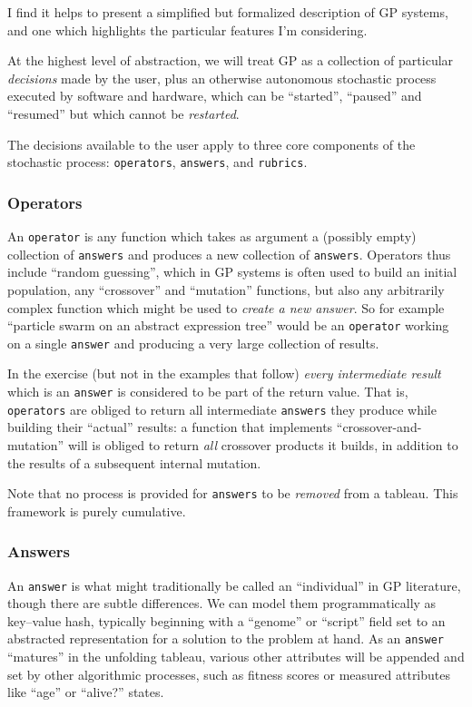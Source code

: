 I find it helps to present a simplified but formalized description of GP systems, and one which highlights the particular features I'm considering.

At the highest level of abstraction, we will treat GP as a collection of particular \emph{decisions} made by the user, plus an otherwise autonomous stochastic process executed by software and hardware, which can be ``started'', ``paused'' and ``resumed'' but which cannot be \emph{restarted}.

The decisions available to the user apply to three core components of the stochastic process: {\tt operators}, {\tt answers}, and {\tt rubrics}.

\subsubsection{Operators}\hypertarget{operators}{}\label{operators}

An {\tt operator} is any function which takes as argument a (possibly empty) collection of {\tt answers} and produces a new collection of {\tt answers}. Operators thus include ``random guessing'', which in GP systems is often used to build an initial population, any ``crossover'' and ``mutation'' functions, but also any arbitrarily complex function which might be used to \emph{create a new answer}. So for example ``particle swarm on an abstract expression tree'' would be an {\tt operator} working on a single {\tt answer} and producing a very large collection of results.

In the exercise (but not in the examples that follow) \emph{every intermediate result} which is an {\tt answer} is considered to be part of the return value. That is, {\tt operators} are obliged to return all intermediate {\tt answers} they produce while building their ``actual'' results: a function that implements ``crossover-and-mutation'' will is obliged to return \emph{all} crossover products it builds, in addition to the results of a subsequent internal mutation.

Note that no process is provided for {\tt answers} to be \emph{removed} from a tableau. This framework is purely cumulative.

\subsubsection{Answers}\hypertarget{answers}{}\label{answers}

An {\tt answer} is what might traditionally be called an ``individual'' in GP literature, though there are subtle differences. We can model them programmatically as key--value hash, typically beginning with a ``genome'' or ``script'' field set to an abstracted representation for a solution to the problem at hand. As an {\tt answer} ``matures'' in the unfolding tableau, various  other attributes will be appended and set by other algorithmic processes, such as fitness scores or measured attributes like ``age'' or ``alive?'' states.

